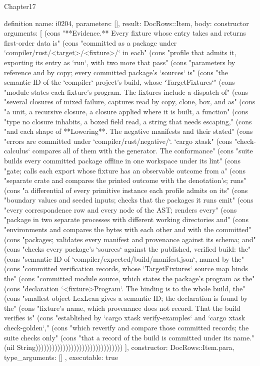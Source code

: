 \begin{lexlean}{Chapter17}
\begin{semanticmodule}
definition{
  name: i0204,
  parameters: [],
  result: DocRows::Item,
  body: constructor{
    arguments: [
      (cons "**Evidence.** Every fixture whose entry takes and returns first-order data is" (cons "committed as a package under `compiler/rust/<target>/<fixture>/` in each" (cons "profile that admits it, exporting its entry as `run`, with two more that pass" (cons "parameters by reference and by copy; every committed package's `sources` is" (cons "the semantic ID of the `compiler` project's build, whose `TargetFixtures`" (cons "module states each fixture's program. The fixtures include a dispatch of" (cons "several closures of mixed failure, captures read by copy, clone, box, and as" (cons "a unit, a recursive closure, a closure applied where it is built, a function" (cons "type no closure inhabits, a boxed field read, a string that needs escaping," (cons "and each shape of **Lowering**. The negative manifests and their stated" (cons "errors are committed under `compiler/rust/negative/`. `cargo xtask" (cons "check-calculus` compares all of them with the generator. The conformance" (cons "suite builds every committed package offline in one workspace under its lint" (cons "gate; calls each export whose fixture has an observable outcome from a" (cons "separate crate and compares the printed outcome with the denotation's; runs" (cons "a differential of every primitive instance each profile admits on its" (cons "boundary values and seeded inputs; checks that the packages it runs emit" (cons "every correspondence row and every node of the AST; renders every" (cons "package in two separate processes with different working directories and" (cons "environments and compares the bytes with each other and with the committed" (cons "packages; validates every manifest and provenance against its schema; and" (cons "checks every package's `sources` against the published, verified build: the" (cons "semantic ID of `compiler/expected/build/manifest.json`, named by the" (cons "committed verification records, whose `TargetFixtures` source map binds the" (cons "committed module source, which states the package's program as the" (cons "declaration `<fixture>Program`. The binding is to the whole build, the" (cons "smallest object LexLean gives a semantic ID; the declaration is found by the" (cons "fixture's name, which provenance does not record. That the build verifies is" (cons "established by `cargo xtask verify-examples` and `cargo xtask check-golden`," (cons "which reverify and compare those committed records; the suite checks only" (cons "that a record of the build is committed under its name." (nil String))))))))))))))))))))))))))))))))
    ],
    constructor: DocRows::Item.para,
    type_arguments: []
  },
  executable: true
}


\end{semanticmodule}
\end{lexlean}
